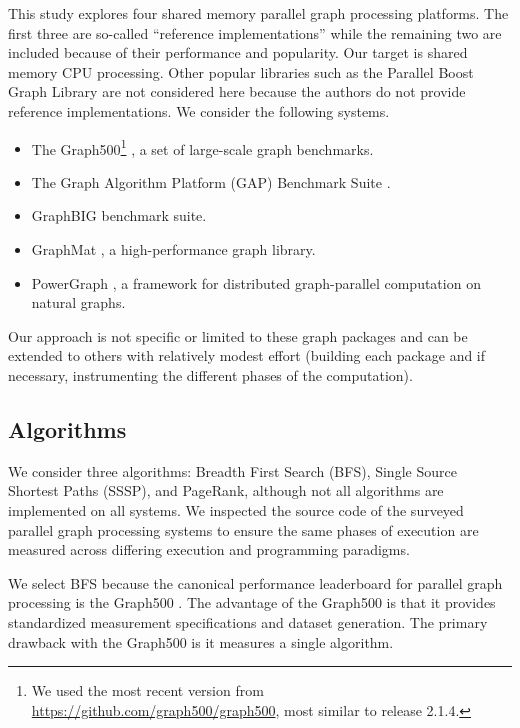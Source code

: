 \documentclass{llncs}
\begin{document}
This study explores four shared memory parallel graph processing platforms. The first three are so-called ``reference implementations'' while the remaining two are included because of their performance and popularity. Our target is shared memory CPU processing. Other popular libraries such as the Parallel Boost Graph Library \cite{Gregor:2005:PBGL} are not considered here because the authors do not provide reference implementations. We consider the following systems.
\begin{itemize}
	\item The Graph500\footnote{We used the most recent version from \url{https://github.com/graph500/graph500}, most similar to release 2.1.4.} \cite{Murphy:2010:Graph500}, a set of large-scale graph benchmarks.
	\item The Graph Algorithm Platform (GAP) Benchmark Suite \cite{Beamer:2015:GAPBench}.
	\item GraphBIG \cite{Nai:2015:Graphbig} benchmark suite.
	\item GraphMat \cite{Sundaram:2015:GraphMat}, a high-performance graph library.
	\item PowerGraph \cite{Gonzalez:2012:Powergraph}, a framework for distributed graph-parallel computation on natural graphs.
\end{itemize}

Our approach is not specific or limited to these graph packages and can be extended to others with relatively modest effort (building each package and if necessary, instrumenting the different phases of the computation).

\subsection{Algorithms}\label{sec:algs}


We consider three algorithms: Breadth First Search (BFS), Single Source Shortest Paths (SSSP), and PageRank, although not all algorithms are implemented on all systems. We inspected the source code of the surveyed parallel graph processing systems to ensure the same phases of execution are measured across differing execution and programming paradigms. 

We select BFS because the canonical performance leaderboard for parallel graph processing is the Graph500 \cite{Murphy:2010:Graph500}. The advantage of the Graph500 is that it provides standardized measurement specifications and dataset generation. The primary drawback with the Graph500 is it measures a single algorithm.
\end{document}
